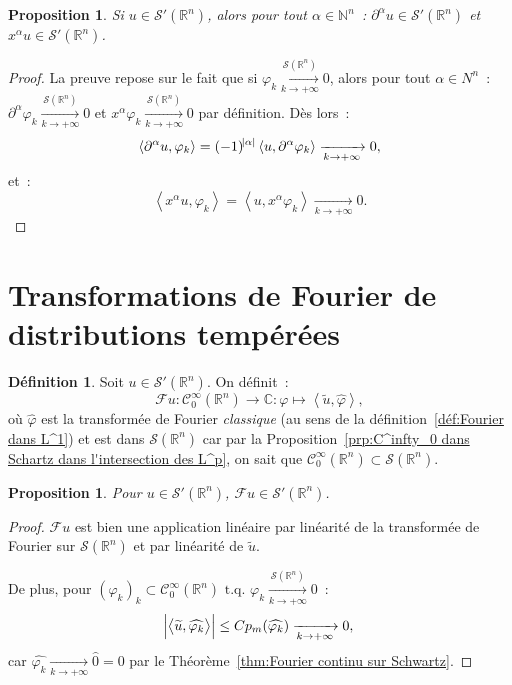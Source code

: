\documentclass{report}
\newcommand{\C}{{\mathbb C}}
\newcommand{\R}{{\mathbb R}}
\newcommand{\N}{{\mathbb N}}
\newcommand{\scpr}[2]{\left\langle#1, #2\right\rangle}
\newcommand{\tq}{\text{ t.q. }}
\newcommand{\st}{\tq}
\newcommand{\pinfty}{{+\infty}}
\newtheorem{prp}[thm]{Proposition}
\theoremstyle{definition}
\newtheorem{déf}[thm]{Définition}
\theoremstyle{remark}
\begin{document}
\begin{prp} Si $u \in \mathcal S'(\R^n)$, alors pour tout $\alpha \in \N^n$~: $\partial^\alpha u \in \mathcal S'(\R^n)$ et $x^\alpha u \in \mathcal S'(\R^n)$.
\end{prp}

\begin{proof} La preuve repose sur le fait que si $\varphi_k \xrightarrow[k \to \pinfty]{\mathcal S(\R^n)} 0$, alors pour tout $\alpha \in N^n$~:
$\partial^\alpha \varphi_k \xrightarrow[k \to \pinfty]{\mathcal S(\R^n)} 0$ et $x^\alpha \varphi_k \xrightarrow[k \to \pinfty]{\mathcal S(\R^n)} 0$ par définition. Dès lors~:
\[\scpr {\partial^\alpha u}{\varphi_k} = (-1)^{\abs \alpha}\scpr u{\partial^\alpha \varphi_k} \xrightarrow[k \to \pinfty]{} 0,\]
et~:
\[\scpr {x^\alpha u}{\varphi_k} = \scpr u{x^\alpha \varphi_k} \xrightarrow[k \to \pinfty]{} 0.\]
\end{proof}

\section{Transformations de Fourier de distributions tempérées}

\begin{déf} Soit $u \in \mathcal S'(\R^n)$. On définit~:
\[\mathcal Fu : \mathcal C^\infty_0(\R^n) \to \C : \varphi \mapsto \scpr {\widetilde u}{\widehat \varphi},\]
où $\widehat \varphi$ est la transformée de Fourier \textit{classique} (au sens de la définition~\ref{déf:Fourier dans L^1}) et est dans $\mathcal S(\R^n)$ car
par la Proposition~\ref{prp:C^infty_0 dans Schartz dans l'intersection des L^p}, on sait que $\mathcal C^\infty_0(\R^n) \subset \mathcal S(\R^n)$.
\end{déf}

\begin{prp} Pour $u \in \mathcal S'(\R^n)$, $\mathcal Fu \in \mathcal S'(\R^n)$.
\end{prp}

\begin{proof} $\mathcal Fu$ est bien une application linéaire par linéarité de la transformée de Fourier sur $\mathcal S(\R^n)$ et par linéarité de $\widetilde u$.

De plus, pour $(\varphi_k)_k \subset \mathcal C^\infty_0(\R^n) \st \varphi_k \xrightarrow[k \to \pinfty]{\mathcal S(\R^n)} 0$~:
\[\abs {\scpr {\widetilde u}{\widehat {\varphi_k}}} \leq Cp_m(\widehat {\varphi_k}) \xrightarrow[k \to \pinfty]{} 0,\]
car $\widehat {\varphi_k} \xrightarrow[k \to \pinfty]{} \widehat 0 = 0$ par le Théorème~\ref{thm:Fourier continu sur Schwartz}.
\end{proof}
\end{document}
